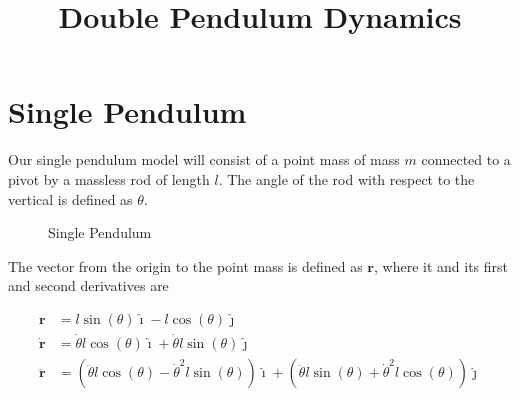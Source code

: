 \documentclass{article}
\begin{document}
\title{Double Pendulum Dynamics}
\author{}
\date{}
\maketitle

\section{Single Pendulum}
Our single pendulum model will consist of a point mass of mass $m$ connected to a pivot by a massless rod of length $l$. The angle of the rod with respect to the vertical is defined as $\theta$.
\begin{figure}[h]
    \centering
    \caption{Single Pendulum}
    \label{fig:Single Pendulum}
\end{figure}

The vector from the origin to the point mass is defined as $\mathbf{r}$, where it and its first and second derivatives are

\begin{align*}
    \mathbf{r} &= l \sin(\theta) \hat{\imath} - l \cos(\theta) \hat{\jmath} \\
    \dot{\mathbf{r}} &= \dot{\theta} l \cos(\theta) \hat{\imath} + \dot{\theta} l \sin(\theta) \hat{\jmath} \\
    \ddot{\mathbf{r}} &= \left( \ddot{\theta} l \cos(\theta) - \dot{\theta}^2 l \sin(\theta) \right) \hat{\imath} + \left( \ddot{\theta} l \sin(\theta) + \dot{\theta}^2 l \cos(\theta) \right) \hat{\jmath}
\end{align*}
\end{document}
